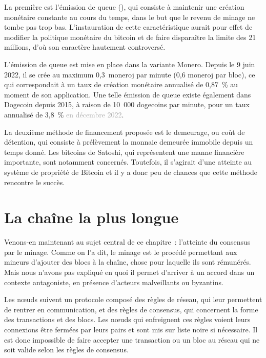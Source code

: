 La première est l'émission de queue (), qui consiste à maintenir une création monétaire constante au cours du temps, dans le but que le revenu de minage ne tombe pas trop bas. L'instauration de cette caractéristique aurait pour effet de modifier la politique monétaire du bitcoin et de faire disparaître la limite des 21 millions, d'où son caractère hautement controversé.

L'émission de queue est mise en place dans la variante Monero. Depuis le 9 juin 2022, il se crée au maximum 0,3~moneroj par minute (0,6 moneroj par bloc), ce qui correspondait à un taux de création monétaire annualisé de 0,87~\% au moment de son application. Une telle émission de queue existe également dans Dogecoin depuis 2015, à raison de 10~000 dogecoins par minute, pour un taux annualisé de 3,8~\% \textcolor{darkgray}{en décembre 2022}.

La deuxième méthode de financement proposée est le demeurage, ou coût de détention, qui consiste à prélèvement la monnaie demeurée immobile depuis un temps donné. Les bitcoins de Satoshi, qui représentent une manne financière importante, sont notamment concernés. Toutefois, il s'agirait d'une atteinte au système de propriété de Bitcoin et il y a donc peu de chances que cette méthode rencontre le succès.

\section*{La chaîne la plus longue}

Venons-en maintenant au sujet central de ce chapitre~: l'atteinte du consensus par le minage. Comme on l'a dit, le minage est le procédé permettant aux mineurs d'ajouter des blocs à la chaîne, chose pour laquelle ils sont rémunérés. Mais nous n'avons pas expliqué en quoi il permet d'arriver à un accord dans un contexte antagoniste, en présence d'acteurs malveillants ou byzantins.

Les nœuds suivent un protocole composé des règles de réseau, qui leur permettent de rentrer en communication, et des règles de consensus, qui concernent la forme des transactions et des blocs. Les nœuds qui enfreignent ces règles voient leurs connexions être fermées par leurs pairs et sont mis sur liste noire si nécessaire. Il est donc impossible de faire accepter une transaction ou un bloc au réseau qui ne soit valide selon les règles de consensus.

